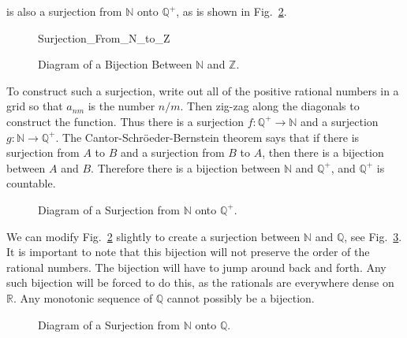 \documentclass[crop=false,class=book,oneside]{standalone}
\begin{document}
            is also a surjection from $\mathbb{N}$ onto
            $\mathbb{Q}^{+}$, as is shown in
            Fig.~\ref{fig:MEASURE_THEORY:BIJECTION_N_AND_Q_Plus}.
            \newpage
            \begin{figure}[H]
                \centering
                \captionsetup{type=figure}
                {Surjection_From_N_to_Z}
                \caption{Diagram of a Bijection Between
                         $\mathbb{N}$ and $\mathbb{Z}$.}
                \label{fig:MEASURE_THEORY:BIJECTION_N_AND_Z}
            \end{figure}
            To construct such a surjection, write out all of the
            positive rational numbers in a grid so that $a_{nm}$ is
            the number $n/m$. Then zig-zag along the diagonals
            to construct the function. Thus there is a surjection
            $f:\mathbb{Q}^{+}\rightarrow\mathbb{N}$
            and a surjection $g:\mathbb{N}\rightarrow\mathbb{Q}^{+}$. The
            Cantor-Schr\"{o}eder-Bernstein theorem says that if there
            is surjection from $A$ to $B$ and a surjection from $B$
            to $A$, then there is a bijection between $A$ and $B$.
            Therefore there is a bijection between $\mathbb{N}$ and
            $\mathbb{Q}^{+}$, and $\mathbb{Q}^{+}$ is countable.
            \begin{figure}[H]
                \centering
                \captionsetup{type=figure}
                \caption{Diagram of a Surjection from
                         $\mathbb{N}$ onto $\mathbb{Q}^{+}$.}
                \label{fig:MEASURE_THEORY:BIJECTION_N_AND_Q_Plus}
            \end{figure}
            We can modify
            Fig.~\ref{fig:MEASURE_THEORY:BIJECTION_N_AND_Q_Plus}
            slightly to create a surjection between $\mathbb{N}$ and
            $\mathbb{Q}$, see
            Fig.~\ref{fig:MEASURE_THEORY:BIJECTION_N_AND_Q}.
            It is important to note that this bijection will not
            preserve the order of the rational numbers. The bijection
            will have to jump around back and forth. Any such
            bijection will be forced to do this, as the rationals are
            everywhere dense on $\mathbb{R}$. Any monotonic sequence of
            $\mathbb{Q}$ cannot possibly be a bijection.
            \begin{figure}[H]
                \centering
                \captionsetup{type=figure}
                \caption{Diagram of a Surjection from
                         $\mathbb{N}$ onto $\mathbb{Q}$.}
                \label{fig:MEASURE_THEORY:BIJECTION_N_AND_Q}
            \end{figure}
\end{document}
